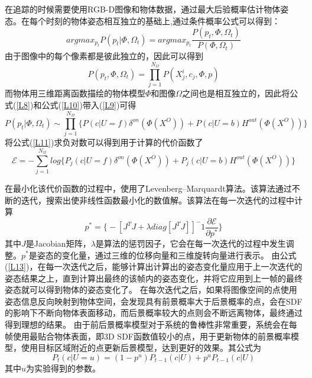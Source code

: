 在追踪的时候需要使用RGB-D图像和物体数据，通过最大后验概率估计物体姿态。在每个时刻的物体姿态相互独立的基础上,通过条件概率公式可以得到：
\begin{equation}\label{L9}
argmax_{p_t}P(p_t|\Phi,\Omega_t) = argmax_{p_t}\frac{P(p_t,\Phi,\Omega_t)}{P(\Phi,\Omega_t)}
\end{equation}
由于图像中的每个像素都是彼此独立的，因此可以得到
\begin{equation}\label{L10}
P(p_t,\Phi,\Omega_t)=\prod_{j=1}^{N_\Omega}P(X_j^i, c_j, \Phi, p)
\end{equation}
而物体用三维距离函数描绘的物体模型$\Phi$和图像$\Omega$之间也是相互独立的，因此将公式(\ref{L8})和公式(\ref{L10})带入(\ref{L9})可得
\begin{equation}\label{L11}
P(p_t|\Phi,\Omega_t) \sim \prod_{j=1}^{N_\Omega}\Big\{P(c|U=f)\delta^{on}(\Phi(X^O)) + P(c|U=b)H^{out}(\Phi(X^O))\Big\}
\end{equation}
将公式(\ref{L11})求负对数可以得到用于计算的代价函数了
\begin{equation}\label{L12}
\mathscr{E} = -\sum_{j=1}^{N_\Omega}log\Big\{P_j(c|U=f)\delta^{on}(\Phi(X^O)) + P_j(c|U=b)H^{out}(\Phi(X^O))\Big\}
\end{equation}

在最小化该代价函数的过程中，使用了Levenberg–Marquardt算法。该算法通过不断的迭代，搜索出使非线性函数最小化的数值解。该算法在每一次迭代的过程中计算
\begin{equation}\label{L13}
p^*=\Big\{-[J^TJ + \lambda diag[J^TJ]]^-1\frac{\partial\mathscr{E}}{\partial p^*}\Big\}
\end{equation}
其中$J$是Jacobian矩阵，$\lambda$是算法的惩罚因子，它会在每一次迭代的过程中发生调整。$p^*$是姿态的变化量，通过三维的位移向量和三维旋转向量进行表示。
由公式(\ref{L13})，在每一次迭代之后，能够计算出计算出的姿态变化量应用于上一次迭代的姿态结果之上，直到计算出最终的该帧内的姿态变化，并将它应用到上一帧的最终姿态就可以得到物体的姿态变化了。
在每次迭代之后，如果将图像空间的点使用姿态信息反向映射到物体空间，会发现具有前景概率大于后景概率的点，会在SDF的影响下不断向物体表面移动，而后景概率较大的点则会不断远离物体，最终通过得到理想的结果。
由于前后景概率模型对于系统的鲁棒性非常重要，系统会在每帧使用最贴合物体表面，即3D SDF函数值较小的点，用于更新物体的前景概率模型，使用目标区域附近的点更新后景模型，达到更好的效果。其公式为
\begin{equation}
P_t(c|U=u)=(1-p^u)P_{t-1}(c|U) + p^uP_{t-1}(c|U)
\end{equation}
其中$u$为实验得到的参数。

